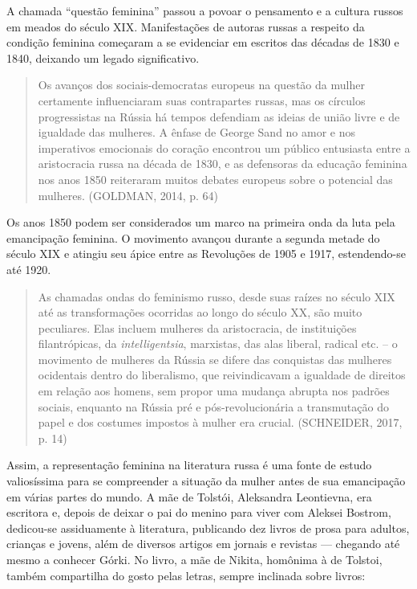 \documentclass{article}
\begin{document}
A chamada ``questão feminina'' passou a povoar o pensamento e a cultura
russos em meados do século XIX. Manifestações de autoras russas a
respeito da condição feminina começaram a se evidenciar em escritos das
décadas de 1830 e 1840, deixando um legado significativo.

\begin{quote}
Os avanços dos sociais-democratas europeus na questão da mulher
certamente influenciaram suas contrapartes russas, mas os círculos
progressistas na Rússia há tempos defendiam as ideias de união livre e
de igualdade das mulheres. A ênfase de George Sand no amor e nos
imperativos emocionais do coração encontrou um público entusiasta entre
a aristocracia russa na década de 1830, e as defensoras da educação
feminina nos anos 1850 reiteraram muitos debates europeus sobre o
potencial das mulheres. (GOLDMAN, 2014, p. 64)
\end{quote}

Os anos 1850 podem ser considerados um marco na primeira onda da luta
pela emancipação feminina. O movimento avançou durante a segunda metade
do século XIX e atingiu seu ápice entre as Revoluções de 1905 e 1917,
estendendo-se até 1920.

\begin{quote}
As chamadas ondas do feminismo russo, desde suas raízes no século XIX
até as transformações ocorridas ao longo do século XX, são muito
peculiares. Elas incluem mulheres da aristocracia, de instituições
filantrópicas, da \emph{intelligentsia}, marxistas, das alas liberal,
radical etc. -- o movimento de mulheres da Rússia se difere das
conquistas das mulheres ocidentais dentro do liberalismo, que
reivindicavam a igualdade de direitos em relação aos homens, sem propor
uma mudança abrupta nos padrões sociais, enquanto na Rússia pré e
pós-revolucionária a transmutação do papel e dos costumes impostos à
mulher era crucial. (SCHNEIDER, 2017, p. 14)
\end{quote}

Assim, a representação feminina na literatura russa é uma fonte de
estudo valiosíssima para se compreender a situação da mulher antes de
sua emancipação em várias partes do mundo. A mãe de Tolstói, Aleksandra
Leontievna, era escritora e, depois de deixar o pai do menino para viver
com Aleksei Bostrom, dedicou-se assiduamente à literatura, publicando
dez livros de prosa para adultos, crianças e jovens, além de diversos
artigos em jornais e revistas --- chegando até mesmo a conhecer Górki.
No livro, a mãe de Nikita, homônima à de Tolstoi, também compartilha do
gosto pelas letras, sempre inclinada sobre livros:
\end{document}
